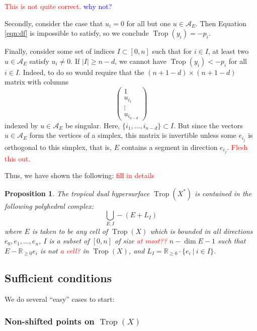 \documentclass[oneside]{amsart}
\newcommand{\A}{\mathcal{A}}
\newcommand{\RR}{\mathbb{R}}
\newcommand{\HOT}{(\star\star\star)}
\DeclareMathOperator{\trop}{Trop}
\newtheorem{prop}[thm]{Proposition}
\theoremstyle{definition}
\newcommand{\nathan}[1]{\textcolor{red}{#1}}
\newcommand{\yoav}[1]{\textcolor{blue}{#1}}
\begin{document}
\nathan{This is not quite correct}. \yoav{why not?}


Secondly, consider the case that $u_i=0$ for all but one $u\in \A_E$. Then Equation \eqref{eqn:df} is impossible to satisfy, so we conclude $\trop(y_i)=-p_i$. 

Finally, consider some set of indices $I\subset [0,n]$ such that for $i\in I$, at least two $u\in \A_E$ satisfy $u_i\neq 0$. If $|I|\geq n-d$, we cannot have $\trop(y_i)<-p_i$ for all $i\in I$. Indeed, to do so would require that the  $(n+1-d)\times (n+1-d)$ matrix with columns 
\[
\left(\begin{array}{c}
1\\
u_{i_1}\\
\vdots\\
u_{i_{n-d}}
\end{array}\right)
\]
indexed by $u\in\A_E$ be singular. Here, $\{i_1,\ldots,i_{n-d}\}\subset I$. But since the vectors $u\in \A_E$ form the vertices of a simplex, this matrix is invertible unless some $e_{i_j}$ is orthogonal to this simplex, that is, $E$ contains a segment in direction $e_{i_j}$. \nathan{Flesh this out.}

Thus, we have shown the following: \nathan{fill in details}
\begin{prop}
The tropical dual hypersurface $\trop(X^*)$ is contained in the following polyhedral complex:
\[
\bigcup_{E,I}  -(E+L_I)
\]
where $E$ is taken to be any cell of $\trop(X)$ which is bounded in all directions $e_0,e_1,\ldots,e_n$, $I$ is a subset of $[0,n]$ of size \nathan{at most??} $n-\dim E -1$ such that $E-\RR_{\geq 0}e_i$ is not \nathan{a cell?} in $\trop(X)$, and $L_I=\RR_{\geq 0}\cdot \{e_i\ |\ i\in I\}$.   
\end{prop}

\subsection{Sufficient conditions}
%
%

We do several ``easy'' cases to start:
\subsubsection{Non-shifted points on $\trop(X)$}\label{sec:nonshift}
\end{document}
